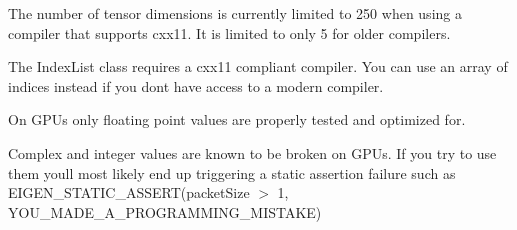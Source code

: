 \begin{DoxyItemize}
\item The number of tensor dimensions is currently limited to 250 when using a compiler that supports cxx11. It is limited to only 5 for older compilers.
\item The Index\+List class requires a cxx11 compliant compiler. You can use an array of indices instead if you don\textquotesingle{}t have access to a modern compiler.
\item On G\+P\+Us only floating point values are properly tested and optimized for.
\item Complex and integer values are known to be broken on G\+P\+Us. If you try to use them you\textquotesingle{}ll most likely end up triggering a static assertion failure such as E\+I\+G\+E\+N\+\_\+\+S\+T\+A\+T\+I\+C\+\_\+\+A\+S\+S\+E\+R\+T(packet\+Size $>$ 1, Y\+O\+U\+\_\+\+M\+A\+D\+E\+\_\+\+A\+\_\+\+P\+R\+O\+G\+R\+A\+M\+M\+I\+N\+G\+\_\+\+M\+I\+S\+T\+A\+K\+E) 
\end{DoxyItemize}